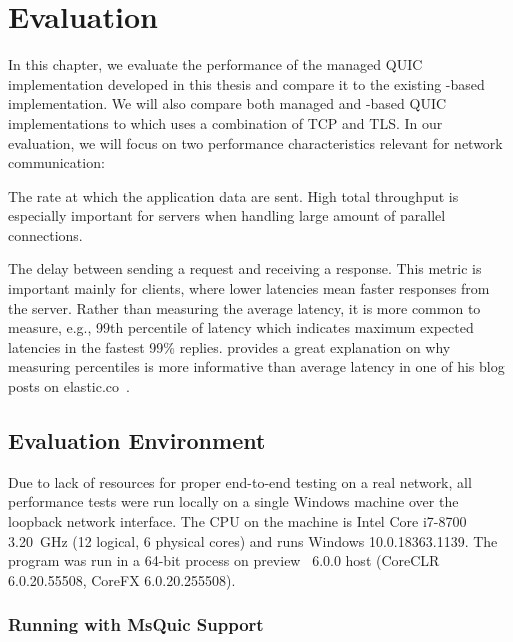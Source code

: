 \chapter{Evaluation}\label{chap:04-evaluation}

In this chapter, we evaluate the performance of the managed QUIC implementation developed in this
thesis and compare it to the existing \libmsquic{}-based implementation. We will also compare both
managed and \libmsquic{}-based QUIC implementations to  which uses a combination of
TCP and TLS\@. In our evaluation, we will focus on two performance characteristics relevant for
network communication:

\begin{itemize}

         The rate at which the application data are sent. High total throughput is
        especially important for servers when handling large amount of parallel connections.

         The delay between sending a request and receiving a
        response. This metric is important mainly for clients, where lower latencies mean faster
        responses from the server. Rather than measuring the average latency, it is more common to
        measure, e.g., 99th percentile of latency which indicates maximum expected latencies in the
        fastest 99\% replies.  provides a great explanation on why
        measuring percentiles is more informative than average latency in one of his blog posts on
        elastic.co~\cite{Tong2014}. 

\end{itemize}

\section{Evaluation Environment}

Due to lack of resources for proper end-to-end testing on a real network, all performance tests were
run locally on a single Windows machine over the loopback network interface. The CPU on the machine
is Intel Core i7-8700 \SI{3.20}{\giga\hertz} (12 logical, 6 physical cores) and runs Windows
10.0.18363.1139. The program was run in a 64-bit process on preview \dotnet{}~6.0.0 host
(CoreCLR 6.0.20.55508, CoreFX 6.0.20.255508).

\subsection{Running with MsQuic Support}

